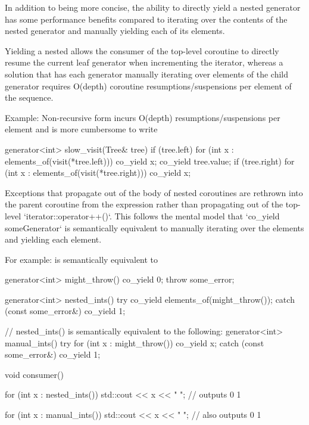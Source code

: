 \documentclass{wg21}
\begin{document}
In addition to being more concise, the ability to directly yield a nested generator has some
performance benefits compared to iterating over the contents of the nested generator and
manually yielding each of its elements.

Yielding a nested  allows the consumer of the top-level coroutine to
directly resume the current leaf generator when incrementing the iterator, whereas a solution that has each generator manually iterating over elements of the child generator
requires O(depth) coroutine resumptions/suspensions per element of the sequence.

Example: Non-recursive form incurs O(depth) resumptions/suspensions per element
and is more cumbersome to write

\begin{colorblock}
    generator<int> slow_visit(Tree& tree) {
        if (tree.left) {
            for (int x : elements_of(visit(*tree.left)))
            co_yield x;
        }
        co_yield tree.value;
        if (tree.right) {
            for (int x : elements_of(visit(*tree.right)))
            co_yield x;
        }
    }
\end{colorblock}

Exceptions that propagate out of the body of nested  coroutines
are rethrown into the parent coroutine from the  expression rather
than propagating out of the top-level `iterator::operator++()`. This follows the mental model that `co_yield someGenerator` is semantically equivalent to manually
iterating over the elements and yielding each element.

For example:  is semantically equivalent to 
\begin{colorblock}
    generator<int> might_throw() {
        co_yield 0;
        throw some_error{};
    }

    generator<int> nested_ints() {
        try {
            co_yield elements_of(might_throw());
        } catch (const some_error&) {}
        co_yield 1;
    }

    // nested_ints() is semantically equivalent to the following:
    generator<int> manual_ints() {
        try {
            for (int x : might_throw()) {
                co_yield x;
            }
        } catch (const some_error&) {}
        co_yield 1;
    }

    void consumer() {
        for (int x : nested_ints()) {
            std::cout << x << " "; // outputs 0 1
        }

        for (int x : manual_ints()) {
            std::cout << x << " "; // also outputs 0 1
        }
    }
\end{colorblock}
\end{document}

